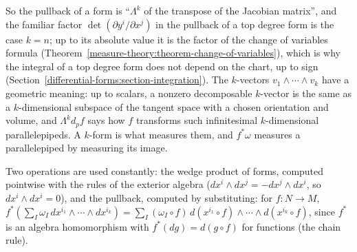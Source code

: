 So the pullback of a form is ``$\Lambda^k$ of the transpose of the Jacobian matrix'', and the familiar factor $\det(\partial y^i/\partial x^j)$ in the pullback of a top degree form is the
case $k = n$; up to its absolute value it is the factor of the change of variables formula (Theorem~\ref{measure-theory:theorem-change-of-variables}), which is why the integral of a top degree
form does not depend on the chart, up to sign (Section~\ref{differential-forms:section-integration}). The $k$-vectors $v_1 \wedge \cdots \wedge v_k$ have a geometric meaning: up to scalars, a
nonzero decomposable $k$-vector is the same as a $k$-dimensional subspace of the tangent space with a chosen orientation and volume, and $\Lambda^kd_pf$ says how $f$ transforms such
infinitesimal $k$-dimensional parallelepipeds. A $k$-form is what measures them, and $f^*\omega$ measures a parallelepiped by measuring its image.

Two operations are used constantly: the wedge product of forms, computed pointwise with the rules of the exterior algebra
($dx^i \wedge dx^j = -dx^j \wedge dx^i$, so $dx^i \wedge dx^i = 0$), and the pullback, computed by substituting: for $f \colon N \to M$,
$f^*(\sum_I\omega_I\,dx^{i_1} \wedge \cdots \wedge dx^{i_k}) = \sum_I(\omega_I \circ f)\,d(x^{i_1} \circ f) \wedge \cdots \wedge d(x^{i_k} \circ f)$, since $f^*$ is an algebra homomorphism with
$f^*(dg) = d(g \circ f)$ for functions (the chain rule).

